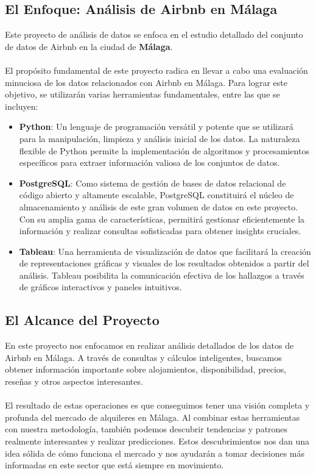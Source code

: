 \subsection{El Enfoque: Análisis de Airbnb en Málaga}

Este proyecto de análisis de datos se enfoca en el estudio detallado del conjunto de datos de Airbnb en la ciudad de \textbf{Málaga}.\\\\
El propósito fundamental de este proyecto radica en llevar a cabo una evaluación minuciosa de los datos relacionados con Airbnb en Málaga. Para lograr este objetivo, se utilizarán varias herramientas fundamentales, entre las que se incluyen:

\begin{itemize}
  \item \textbf{Python}: Un lenguaje de programación versátil y potente que se utilizará para la manipulación, limpieza y análisis inicial de los datos. La naturaleza flexible de Python permite la implementación de algoritmos y procesamientos específicos para extraer información valiosa de los conjuntos de datos.
  
  \item \textbf{PostgreSQL}: Como sistema de gestión de bases de datos relacional de código abierto y altamente escalable, PostgreSQL constituirá el núcleo de almacenamiento y análisis de este gran volumen de datos en este proyecto. Con su amplia gama de características, permitirá gestionar eficientemente la información y realizar consultas sofisticadas para obtener insights cruciales.
  
  \item \textbf{Tableau}: Una herramienta de visualización de datos que facilitará la creación de representaciones gráficas y visuales de los resultados obtenidos a partir del análisis. Tableau posibilita la comunicación efectiva de los hallazgos a través de gráficos interactivos y paneles intuitivos.
\end{itemize}

\subsection{El Alcance del Proyecto}

En este proyecto nos enfocamos en realizar análisis detallados de los datos de Airbnb en Málaga. A través de consultas y cálculos inteligentes, buscamos obtener información importante sobre alojamientos, disponibilidad, precios, reseñas y otros aspectos interesantes.\\\\
El resultado de estas operaciones es que conseguimos tener una visión completa y profunda del mercado de alquileres en Málaga. Al combinar estas herramientas con nuestra metodología, también podemos descubrir tendencias y patrones realmente interesantes y realizar predicciones. Estos descubrimientos nos dan una idea sólida de cómo funciona el mercado y nos ayudarán a tomar decisiones más informadas en este sector que está siempre en movimiento.

